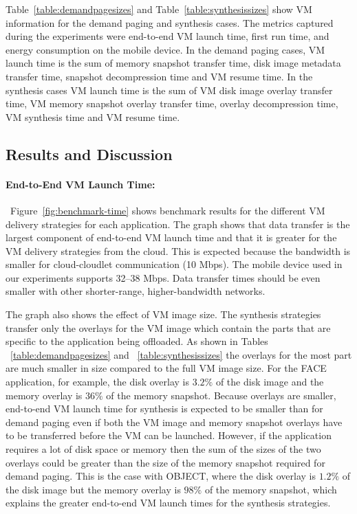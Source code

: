 Table~\ref{table:demandpagesizes} and Table~\ref{table:synthesissizes}
show VM information for the demand paging and synthesis cases.  The
metrics captured during the experiments were end-to-end VM launch
time, first run time, and energy consumption on the mobile device.  In
the demand paging cases, VM launch time is the sum of memory snapshot
transfer time, disk image metadata transfer time, snapshot
decompression time and VM resume time. In the synthesis cases VM
launch time is the sum of VM disk image overlay transfer time, VM
memory snapshot overlay transfer time, overlay decompression time, VM
synthesis time and VM resume time.


\subsection{Results and Discussion}
\label{sec:results}

\begin{figure*}
\centering
{}
\vspace{-0.2in}
\caption{Total Benchmark Time}
\vspace{-0.2in}
\label{fig:benchmark-time}
\end{figure*}

\paragraph{End-to-End VM Launch Time:}~Figure~\ref{fig:benchmark-time}
shows benchmark results for the different VM delivery strategies for
each application. The graph shows that data transfer is the largest
component of end-to-end VM launch time and that it is greater for the
VM delivery strategies from the cloud. This is expected because the
bandwidth is smaller for cloud-cloudlet communication (10 Mbps).  The mobile
device used in our experiments supports 32--38 Mbps. Data transfer
times should be even smaller with other shorter-range,
higher-bandwidth networks.

The graph also shows the effect of VM image size. The synthesis strategies
transfer only the overlays for the VM image which contain the parts that
are specific to the application being offloaded. As shown in Tables 
~\ref{table:demandpagesizes} and ~\ref{table:synthesissizes} the overlays 
for the most part are much smaller in size compared to the full VM image
size. For the FACE application, for example,  the disk overlay is $3.2\%$ 
of the disk image and the memory overlay is $36\%$ of the memory snapshot. 
Because overlays are smaller, end-to-end VM launch time for synthesis is 
expected to be smaller than for demand paging even if both the VM image and 
memory snapshot overlays have to be transferred before the VM can be 
launched. However, if the application requires a lot of disk space or 
memory then the sum of the sizes of the two overlays could be greater than 
the size of the memory snapshot required for demand paging. This is the 
case with OBJECT, where the disk overlay is $1.2\%$ of the 
disk image but the memory overlay is $98\%$ of the memory snapshot, which 
explains the greater end-to-end VM launch times for the synthesis 
strategies.

